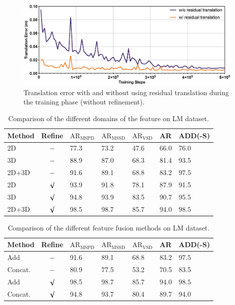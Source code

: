 \documentclass[12pt,DIV14,BCOR12mm,a4paper,footinclude=false,headinclude,parskip=half-,twoside,openright,cleardoublepage=empty,toc=index,bibliography=totoc,listof=totoc]{scrreprt}
\numberwithin{equation}{chapter}
\begin{document}
\begin{figure}[H]
	\centering
	\includegraphics[width=1.\textwidth]{img/ab_trans.eps}
	\caption{Translation error with and without using residual translation during the training phase (without refinement).}
	\label{img:ab_trans}
\end{figure}

\begin{table}[H]
  \centering
  \caption{Comparison of the different domains of the feature on LM dataset.}
  \label{tab:ab_feat_lm}
  \begin{tabular}{l | c | C{16mm} C{16mm} C{16mm}| C{16mm}| C{16mm}}
      \toprule
      Method & Refine & $\text{AR}_{\text{MSPD}}$ & $\text{AR}_{\text{MSSD}}$ & $\text{AR}_{\text{VSD}}$ & AR & ADD(-S) \\
      \midrule
      2D  & $-$ & 77.3 & 73.2 & 47.6 & 66.0 & 76.0 \\
      3D & $-$ & 88.9 & 87.0 & 68.3 & 81.4 & 93.5 \\
      2D+3D  & $-$ & 91.6 & 89.1 & 68.8 & $\mathbf{83.2}$ & $\mathbf{97.5}$ \\
      2D  & $\surd$ & 93.9 & 91.8 & 78.1 & 87.9 & 91.5 \\
      3D & $\surd$ & 94.8 & 93.9 & 83.5 & 90.7 & 95.5 \\
      2D+3D  & $\surd$ & 98.5 & 98.7 & 85.7 & $\mathbf{94.0}$ & $\mathbf{98.5}$ \\
      \bottomrule
  \end{tabular}
\end{table}

\begin{table}[H]
  \centering
  \caption{Comparison of the different feature fusion methods on LM dataset.}
  \label{tab:ab_fusion_lm}
  \begin{tabular}{l | c | C{16mm} C{16mm} C{16mm}| C{16mm}| C{16mm}}
      \toprule
      Method & Refine & $\text{AR}_{\text{MSPD}}$ & $\text{AR}_{\text{MSSD}}$ & $\text{AR}_{\text{VSD}}$ & AR & ADD(-S) \\
      \midrule
      Add  & $-$ & 91.6 & 89.1 & 68.8 & $\mathbf{83.2}$ & $\mathbf{97.5}$ \\
      Concat. & $-$ & 80.9 & 77.5 & 53.2 & 70.5 & 83.5 \\
      Add  & $\surd $ & 98.5 & 98.7 & 85.7 & $\mathbf{94.0}$ & $\mathbf{98.5}$ \\
      Concat. & $\surd $ & 94.8 & 93.7 & 80.4 & 89.7 & 94.0 \\
      \bottomrule
  \end{tabular}
\end{table}
\end{document}
